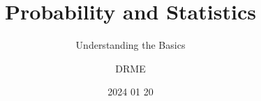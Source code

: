 \documentclass{beamer}
\begin{document}
\title{Probability and Statistics}
\subtitle{Understanding the Basics}
\author{DRME}
\date{2024 01 20}

\begin{frame}
  \titlepage
\end{frame}







\end{document}
